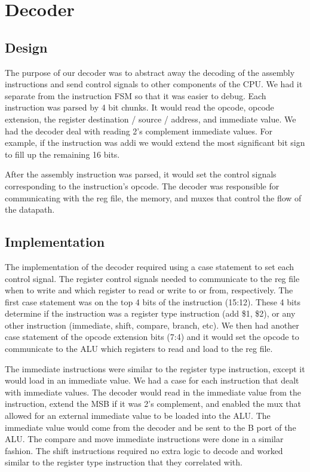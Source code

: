\documentclass[11pt]{article}
\begin{document}
\section{Decoder}

\subsection{Design}
The purpose of our decoder was to abstract away the decoding of the assembly instructions and send control signals to other components of the CPU. We had it separate from the instruction FSM so that it was easier to debug. Each instruction was parsed by 4 bit chunks. It would read the opcode,  opcode extension, the register destination / source / address, and immediate value. We had the decoder deal with reading 2’s complement immediate values. For example, if the instruction was addi we would extend the most significant bit sign to fill up the remaining 16 bits. 

After the assembly instruction was parsed, it would set the control signals corresponding to the instruction’s opcode. The decoder was responsible for communicating with the reg file, the memory, and muxes that control the flow of the datapath. 

\subsection{Implementation}
The implementation of the decoder required using a case statement to set each control signal. The register control signals needed to communicate to the reg file when to write and which register to read or write to or from, respectively. The first case statement was on the top 4 bits of the instruction (15:12). These 4 bits determine if the instruction was a register type instruction (add \$1, \$2), or any other instruction (immediate, shift, compare, branch, etc). We then had another case statement of the opcode extension bits (7:4) and it would set the opcode to communicate to the ALU which registers to read and load to the reg file.

The immediate instructions were similar to the register type instruction, except it would load in an immediate value. We had a case for each instruction that dealt with immediate values. The decoder would read in the immediate value from the instruction, extend the MSB if it was 2’s complement, and enabled the mux that allowed for an external immediate value to be loaded into the ALU. The immediate value would come from the decoder and be sent to the B port of the ALU. The compare and move immediate instructions were done in a similar fashion. The shift instructions required no extra logic to decode and worked similar to the register type instruction that they correlated with.
\end{document}
